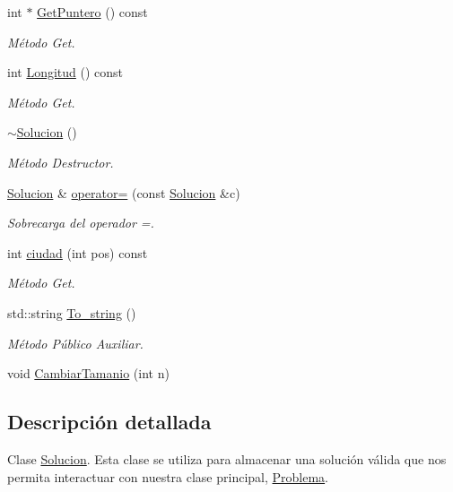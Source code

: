 \begin{DoxyCompactItemize}
int $\ast$ \hyperlink{class_solucion_a3e82f2c3536bcdb9a0b87b77db2576a7}{Get\+Puntero} () const 
\begin{DoxyCompactList}\small\item\em Método Get. \end{DoxyCompactList}\item 
int \hyperlink{class_solucion_af6c63418791149493213c4b1f5a5e9ab}{Longitud} () const 
\begin{DoxyCompactList}\small\item\em Método Get. \end{DoxyCompactList}\item 
\hyperlink{class_solucion_abcd722b5e063f2a2a54c0d48b349c76a}{$\sim$\+Solucion} ()
\begin{DoxyCompactList}\small\item\em Método Destructor. \end{DoxyCompactList}\item 
\hyperlink{class_solucion}{Solucion} \& \hyperlink{class_solucion_a9c5d670e6cac2b067ce819e2afcfe4b1}{operator=} (const \hyperlink{class_solucion}{Solucion} \&c)
\begin{DoxyCompactList}\small\item\em Sobrecarga del operador =. \end{DoxyCompactList}\item 
int \hyperlink{class_solucion_afa9416d8604b0e2a17a623cf20287ae6}{ciudad} (int pos) const 
\begin{DoxyCompactList}\small\item\em Método Get. \end{DoxyCompactList}\item 
std\+::string \hyperlink{class_solucion_a6112a06f010b863b0a4a324f9ccfc5e9}{To\+\_\+string} ()
\begin{DoxyCompactList}\small\item\em Método Público Auxiliar. \end{DoxyCompactList}\item 
void \hyperlink{class_solucion_a9928e3f8acfd0097437dc53452aadd99}{Cambiar\+Tamanio} (int n)
\end{DoxyCompactItemize}


\subsection{Descripción detallada}
Clase \hyperlink{class_solucion}{Solucion}. Esta clase se utiliza para almacenar una solución válida que nos permita interactuar con nuestra clase principal, \hyperlink{class_problema}{Problema}. 

